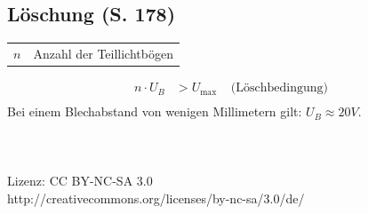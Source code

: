 \documentclass[a4paper,twocolumn,10pt]{article}
\begin{document}
\subsection{Löschung (S. 178)}
\begin{tabular}{ll}
$n$ & Anzahl der Teillichtbögen
\end{tabular}
\begin{equation*}
\begin{split}
n\cdot U_B&>U_{\text{max}}\;\;\;\;\text{(Löschbedingung)}\\
\end{split}
\end{equation*}
Bei einem Blechabstand von wenigen Millimetern gilt: $U_B\approx 20V$.
\\\\\\\\
Lizenz: CC BY-NC-SA 3.0\\
http://creativecommons.org/licenses/by-nc-sa/3.0/de/
\end{document}
